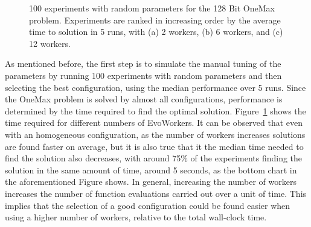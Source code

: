 \documentclass{llncs}
\begin{document}
\begin{figure}[h!t]
    \centering

    \caption{100 experiments with random parameters for the 128 Bit OneMax problem.
    Experiments are ranked in increasing order by the average time to solution in 5 runs, with   
    (a) 2 workers, (b) 6 workers, and (c) 12 workers.} 
    \label{fig:effort}
  \end{figure}
As mentioned before, the first step is to simulate the manual tuning of the parameters 
by running 100 experiments with random parameters and then selecting the best configuration, 
using the median performance over 5 runs. Since the OneMax problem is solved by almost all
configurations, performance is determined by the time required to find the optimal solution.
Figure~\ref{fig:effort} shows the time required for different numbers of EvoWorkers. 
It can be observed that even with an homogeneous configuration, as the number of workers 
increases solutions are found faster on average, but it is also true
that it the median time needed to find the solution also decreases,
with around 75\% of the experiments finding the solution in the same
amount of time, around 5 seconds, as the bottom chart in the
aforementioned Figure shows.  In general, increasing the number of workers increases 
the number of function evaluations carried out over a unit of time. This implies that the selection
of a good configuration could be found easier when using a higher number of workers, relative
to the total wall-clock time.  
\end{document}
